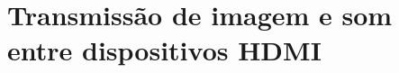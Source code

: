 \section{Transmissão de imagem e som entre dispositivos HDMI} \label{ap2:imagem_som_RX_TX}
%
%
%
%
%
%
%
%
%
%
%
%
%
%
%
%
%
%
%
%
%
%
%
%
%
%
%
%
%
%
%
%
%
%

